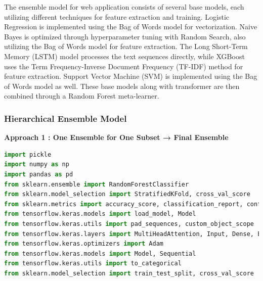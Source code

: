 \vspace{1em}

\noindent
The ensemble model for web application consists of several base models, each utilizing different techniques for feature extraction and training. Logistic Regression is implemented using the Bag of Words model for vectorization. Naive Bayes is optimized through hyperparameter tuning with Random Search, also utilizing the Bag of Words model for feature extraction. The Long Short-Term Memory (LSTM) model processes the text sequences directly, while XGBoost uses the Term Frequency-Inverse Document Frequency (TF-IDF) method for feature extraction. Support Vector Machine (SVM) is implemented using the Bag of Words model as well. These base models along with transformer are then combined through a Random Forest meta-learner.


\subsubsection{Hierarchical Ensemble Model}

\textbf{Approach 1 : One Ensemble for One Subset → Final Ensemble}

\begin{tcolorbox}[colback=gray!5!white, colframe=gray!80!black, boxrule=0.5pt, title=Hierarchical Ensemble Model 1] 
    \begin{lstlisting}[language=Python]
import pickle
import numpy as np
import pandas as pd
from sklearn.ensemble import RandomForestClassifier
from sklearn.model_selection import StratifiedKFold, cross_val_score
from sklearn.metrics import accuracy_score, classification_report, confusion_matrix
from tensorflow.keras.models import load_model, Model
from tensorflow.keras.utils import pad_sequences, custom_object_scope
from tensorflow.keras.layers import MultiHeadAttention, Input, Dense, Embedding, GlobalAveragePooling1D, LayerNormalization, Layer
from tensorflow.keras.optimizers import Adam
from tensorflow.keras.models import Model, Sequential
from tensorflow.keras.utils import to_categorical
from sklearn.model_selection import train_test_split, cross_val_score
\end{lstlisting}
\end{tcolorbox}

